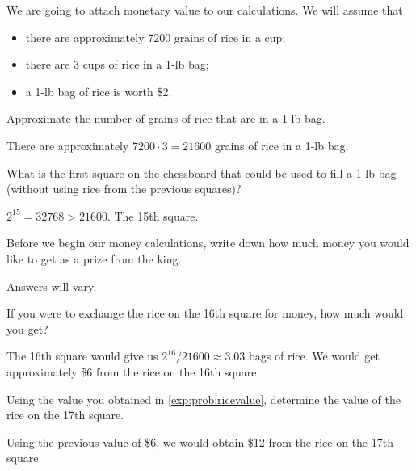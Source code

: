 \begin{problem}
We are going to attach monetary value to our calculations. We will assume that
\begin{itemize}
	\item there are approximately 7200 grains of rice in a cup;
	\item there are 3 cups of rice in a 1-lb bag;
	\item a 1-lb bag of rice is worth \$2. 
\end{itemize}
\begin{subproblem}[core]
	Approximate the number of grains of rice that are in a 1-lb bag.
	\begin{shortsolution}
		There are approximately $7200\cdot 3 = 21600$ grains of rice in a 1-lb bag.
	\end{shortsolution}
\end{subproblem}
\begin{subproblem}
	What is the first square on the chessboard that could be used to fill a 1-lb bag (without using rice 
	from the previous squares)?
	\begin{shortsolution}
		$2^{15}=32768>21600$. The 15th square.
	\end{shortsolution}
\end{subproblem}
\begin{subproblem}[core]\label{exp:prob:greedy}
	Before we begin our money calculations, write down how much money you would like 
	to get as a prize from the king.
	\begin{shortsolution}
		Answers will vary.
	\end{shortsolution}
\end{subproblem}
\begin{subproblem}\label{exp:prob:ricevalue}
	If you were to exchange the rice on the 16th square for money, how much would you get?
	\begin{shortsolution}
		The 16th square would give us $2^{16}/21600\approx 3.03$ bags of rice. We would get approximately \$6
		from the rice on the 16th square.
	\end{shortsolution}
\end{subproblem}
\begin{subproblem}
	Using the value you obtained in \cref{exp:prob:ricevalue}, determine the value 
	of the rice on the 17th square.
	\begin{shortsolution}
		Using the previous value of \$6, we would obtain \$12 from the rice on the 17th square.
	\end{shortsolution}
\end{subproblem}

\end{problem}
